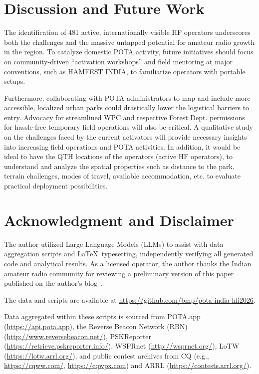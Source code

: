 \documentclass[conference]{IEEEtran}
\newcommand{\repourl}{\url{https://github.com/bmp/pota-india-hfi2026}}
\begin{document}
\section{Discussion and Future Work}
The identification of 481 active, internationally visible HF operators
underscores both the challenges and the massive untapped potential for
amateur radio growth in the region. To catalyze domestic POTA
activity, future initiatives should focus on community-driven
``activation workshops'' and field mentoring at major conventions, such
as HAMFEST INDIA, to familiarize operators with portable setups.

Furthermore, collaborating with POTA administrators to map and include
more accessible, localized urban parks could drastically lower the
logistical barriers to entry. Advocacy for streamlined WPC and
respective Forest Dept. permissions for hassle-free temporary field
operations will also be critical. A qualitative study on the
challenges faced by the current activators will provide necessary
insights into increasing field operations and POTA activities. In
addition, it would be ideal to have the QTH locations of the operators
(active HF operators), to understand and analyze the spatial
properties such as distance to the park, terrain challenges, modes of
travel, available accommodation, etc. to evaluate practical deployment
possibilities.

\section{Acknowledgment and Disclaimer}
The author utilized Large Language Models (LLMs) to assist with data
aggregation scripts and \LaTeX\ typesetting, independently verifying
all generated code and analytical results. As a licensed operator, the
author thanks the Indian amateur radio community for reviewing a
preliminary version of this paper published on the author's blog~\cite{b17}.

The data and scripts are available at \repourl. {\raggedright Data aggregated within these scripts is
  sourced from POTA.app (\url{https://api.pota.app}), the Reverse
  Beacon Network (RBN) (\url{http://www.reversebeacon.net/}),
  PSKReporter (\url{https://retrieve.pskreporter.info/}), WSPRnet
  (\url{http://wsprnet.org/}), LoTW (\url{https://lotw.arrl.org/}),
  and public contest archives from CQ (e.g., \url{https://cqww.com/},
  \url{https://cqwpx.com}) and ARRL
  (\url{https://contests.arrl.org/}).\par}



\end{document}

